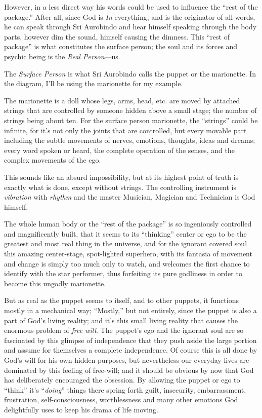 \documentclass[12pt,a4paper]{book}
\begin{document}
However, in a less direct way his words could be used to influence the
``rest of the package.''  After all, since God is \emph{In}
everything, and is the originator of all words, he can speak through
Sri Aurobindo and hear himself speaking through the body parts,
however dim the sound, himself causing the dimness. This ``rest of
package'' is what constitutes the surface person; the soul and its
forces and psychic being is the \emph{Real Person}---us.

The \emph{Surface Person} is what Sri Aurobindo calls the puppet or
the marionette. In the diagram, I'll be using the marionette for my
example.

The marionette is a doll whose legs, arms, head, etc. are moved by
attached strings that are controlled by someone hidden above a small
stage; the number of strings being about ten. For the surface person
marionette, the ``strings'' could be infinite, for it's not only the
joints that are controlled, but every movable part including the
subtle movements of nerves, emotions, thoughts, ideas and dreams;
every word spoken or heard, the complete operation of the senses, and
the complex movements of the ego.

This sounds like an absurd impossibility, but at its highest point of
truth is exactly what is done, except without strings. The controlling
instrument is \emph{vibration} with \emph{rhythm} and the master
Musician, Magician and Technician is God himself.

The whole human body or the ``rest of the package'' is so ingeniously
controlled and magnificently built, that it seems to its ``thinking''
center or ego to be the greatest and most real thing in the universe,
and for the ignorant covered soul this amazing center-stage,
spot-lighted superhero, with its fantasia of movement and change is
simply too much only to watch, and welcomes the first chance to
identify with the star performer, thus forfeiting its pure godliness
in order to become this ungodly marionette.

But as real as the puppet seems to itself, and to other puppets, it
functions mostly in a mechanical way; ``Mostly,'' but not entirely,
since the puppet is also a part of God's living reality; and it's this
small living reality that causes the enormous problem of \emph{free
  will}.  The puppet's ego and the ignorant soul are so fascinated by
this glimpse of independence that they push aside the large portion
and assume for themselves a complete independence.  Of course this is
all done by God's will for his own hidden purposes, but nevertheless
our everyday lives are dominated by this feeling of free-will; and it
should be obvious by now that God has deliberately encouraged the
obsession. By allowing the puppet or ego to ``think'' it's
``\emph{doing}'' things there spring forth guilt, insecurity,
embarrassment, frustration, self-consciousness, worthlessness and many
other emotions God delightfully uses to keep his drama of life moving.
\end{document}

